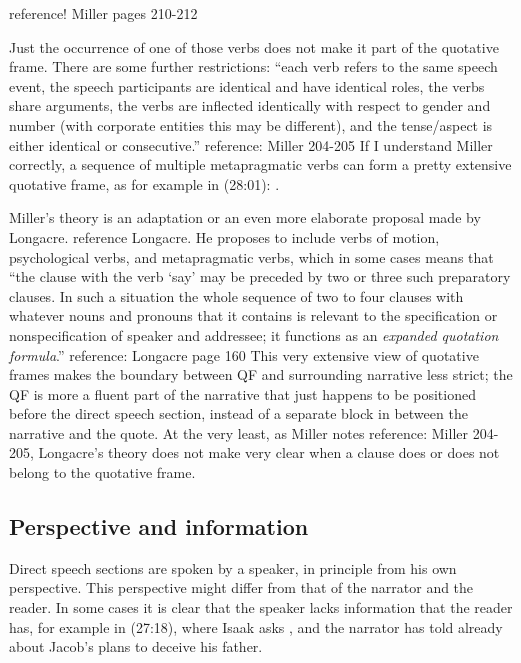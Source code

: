 \documentclass[twoside,a4paper,10pt]{article}
\newcommand{\fixme}[1]{{\color{red} #1}}
\newcommand{\cl}[2]{\begingroup\beginL\begingroup\color{#1}\beginR#2\endR\endgroup\endL\endgroup}
\newcommand{\hebr}[1]{\cjRL{#1}}
\begin{document}
\fixme{reference! Miller pages 210-212}

Just the occurrence of one of those verbs does not make it part of the quotative frame. There are some further restrictions: ``each verb refers to the same speech event, the speech participants are identical and have identical roles, the verbs share arguments, the verbs are inflected identically with respect to gender and number (with corporate entities this may be different), and the tense/aspect is either identical or consecutive.'' \fixme{reference: Miller 204-205} If I understand Miller correctly, a sequence of multiple metapragmatic verbs can form a pretty extensive quotative frame, as for example in (28:01): \hebr{\cl{red}{W JQR>} JYXQ >L J<QB \cl{red}{W JBRK} >TW \cl{red}{W JYWHW} \cl{red}{W J>MR} LW}.

Miller's theory is an adaptation or an even more elaborate proposal made by Longacre. \fixme{reference Longacre}. He proposes to include verbs of motion, psychological verbs, and metapragmatic verbs, which in some cases means that ``the clause with the verb `say' may be preceded by two or three such preparatory clauses. In such a situation the whole sequence of two to four clauses with whatever nouns and pronouns that it contains is relevant to the specification or nonspecification of speaker and addressee; it functions as an \emph{expanded quotation formula}.'' \fixme{reference: Longacre page 160}
This very extensive view of quotative frames makes the boundary between QF and surrounding narrative less strict; the QF is more a fluent part of the narrative that just happens to be positioned before the direct speech section, instead of a separate block in between the narrative and the quote. 
At the very least, as Miller notes \fixme{reference: Miller 204-205}, Longacre's theory does not make very clear when a clause does or does not belong to the quotative frame.

\subsection{Perspective and information}
Direct speech sections are spoken by a speaker, in principle from his own perspective. This perspective might differ from that of the narrator and the reader. In some cases it is clear that the speaker lacks information that the reader has, for example in (27:18), where Isaak asks \hebr{MJ >TH BNJ}, and the narrator has told already about Jacob's plans to deceive his father.
\end{document}
